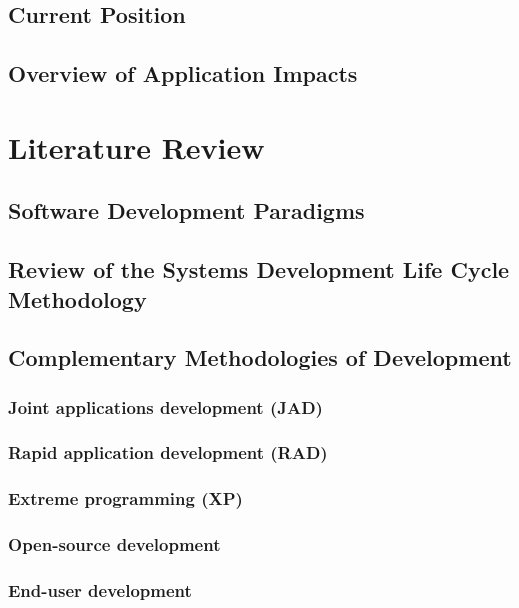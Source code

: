 \documentclass[a4paper,12pt]{article}
\begin{document}
\subsection {Current Position}
\subsection {Overview of Application Impacts}

\section {Literature Review}
\subsection {Software Development Paradigms}
\subsection {Review of the Systems Development Life Cycle Methodology}
\subsection {Complementary Methodologies of Development}

\subsubsection {Joint applications development (JAD)}
\subsubsection {Rapid application development (RAD)}
\subsubsection {Extreme programming (XP)}
\subsubsection {Open-source development}
\subsubsection {End-user development}
\end{document}
